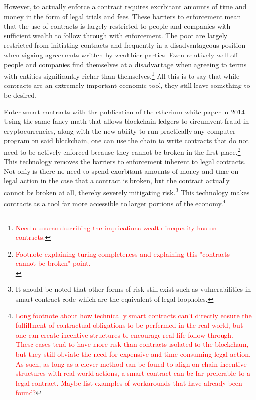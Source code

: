 \documentclass{article}[10pt]
\begin{document}
However, to actually enforce a contract requires exorbitant amounts of time and money in the form of legal trials and fees. 
These barriers to enforcement mean that the use of contracts is largely restricted to people and companies with sufficient wealth to follow through with enforcement. 
The poor are largely restricted from initiating contracts and frequently in a disadvantageous position when signing agreements written by wealthier parties. 
Even relatively well off people and companies find themselves at a disadvantage when agreeing to terms with entities significantly richer than themselves.\footnote{
    \textcolor{red}{Need a source describing the implications wealth inequality has on contracts.}}
All this is to say that while contracts are an extremely important economic tool, they still leave something to be desired. \par 

Enter smart contracts with the publication of the etherium white paper in 2014.\autocite{ethereum2014ethereum} 
Using the same fancy math that allows blockchain ledgers to circumvent fraud in cryptocurrencies, along with the new ability to run practically any computer program on said blockchain, one can use the chain to write contracts that do not need to be actively enforced because they cannot be broken in the first place.\footnote{
    \textcolor{red}{Footnote explaining turing completeness and explaining this "contracts cannot be broken" point.}\\
    \indent \indent {}}
This technology removes the barriers to enforcement inherent to legal contracts. 
Not only is there no need to spend exorbitant amounts of money and time on legal action in the case that a contract is broken, but the contract actually cannot be broken at all, thereby severely mitigating risk.\footnote{
    It should be noted that other forms of risk still exist such as vulnerabilities in smart contract code which are the equivalent of legal loopholes.}
This technology makes contracts as a tool far more accessible to larger portions of the economy.\footnote{
    \textcolor{red}{Long footnote about how technically smart contracts can’t directly ensure the fulfillment of contractual obligations to be performed in the real world, but one can create incentive structures to encourage real-life follow-through. 
    These cases tend to have more risk than contracts isolated to the blockchain, but they still obviate the need for expensive and time consuming legal action. 
    As such, as long as a clever method can be found to align on-chain incentive structures with real world actions, a smart contract can be far preferable to a legal contract. 
    Maybe list examples of workarounds that have already been found?}} \par
    
\end{document}
